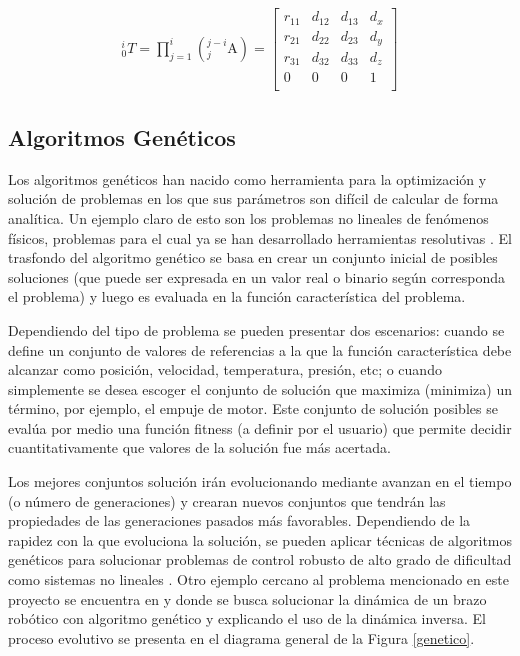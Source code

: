 \documentclass[12pt]{article}
\begin{document}
\begin{gather}
    _{0}^{i}T = \prod_{j=1}^{i} ( _{j}^{j-i}\textrm{A})=
    \begin{bmatrix}
        r_{11}	& d_{12}	& d_{13}	& d_{x}     \\
        r_{21} 	& d_{22}	& d_{23}	& d_{y}     \\
        r_{31}	& d_{32}	& d_{33}	& d_{z}     \\
        0		& 0         & 0         & 1         \\
    \end{bmatrix}
    \label{Matriz T ultima}
\end{gather}


\subsection{Algoritmos Genéticos}

Los algoritmos genéticos han nacido como herramienta para la optimización y solución de problemas en los que sus parámetros son difícil de calcular de forma analítica. Un ejemplo claro de esto son los problemas no lineales de fenómenos físicos, problemas para el cual ya se han desarrollado herramientas resolutivas \cite{ghodousian_efficient_2018}. El trasfondo del algoritmo genético se basa en crear un conjunto inicial de posibles soluciones (que puede ser expresada en un valor real o binario según corresponda el problema) y luego es evaluada en la función característica del problema.

Dependiendo del tipo de problema se pueden presentar dos escenarios: cuando se define un conjunto de valores de referencias a la que la función característica debe alcanzar como posición, velocidad, temperatura, presión, etc; o cuando simplemente se desea escoger el conjunto de solución que maximiza (minimiza) un término, por ejemplo, el empuje de motor. Este conjunto de solución posibles se evalúa por medio una función fitness (a definir por el usuario) que permite decidir cuantitativamente que valores de la solución fue más acertada.

Los mejores conjuntos solución irán evolucionando mediante avanzan en el tiempo (o número de generaciones) y crearan nuevos conjuntos que tendrán las propiedades de las generaciones pasados más favorables. Dependiendo de la rapidez con la que evoluciona la solución, se pueden aplicar técnicas de algoritmos genéticos para solucionar problemas de control robusto de alto grado de dificultad como sistemas no lineales \cite{noauthor_robust_nodate}. Otro ejemplo cercano al problema mencionado en este proyecto se encuentra en \cite{gonzalez_cinematica_2015} y \cite{momani}  donde se busca solucionar la dinámica de un brazo robótico con algoritmo genético y explicando el uso de la dinámica inversa. El proceso evolutivo se presenta en el diagrama general de la Figura \ref{genetico}. \\
\end{document}
